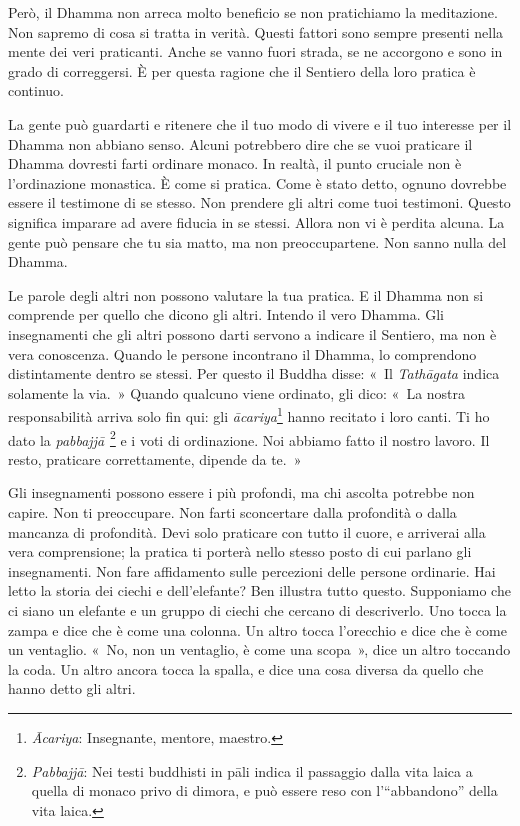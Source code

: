 Però, il Dhamma non arreca molto beneficio se non pratichiamo la
meditazione. Non sapremo di cosa si tratta in verità. Questi fattori
sono sempre presenti nella mente dei veri praticanti. Anche se vanno
fuori strada, se ne accorgono e sono in grado di correggersi. È per
questa ragione che il Sentiero della loro pratica è continuo.

La gente può guardarti e ritenere che il tuo modo di vivere e il tuo
interesse per il Dhamma non abbiano senso. Alcuni potrebbero dire che se
vuoi praticare il Dhamma dovresti farti ordinare monaco. In realtà, il
punto cruciale non è l'ordinazione monastica. È come si pratica. Come è
stato detto, ognuno dovrebbe essere il testimone di se stesso. Non
prendere gli altri come tuoi testimoni. Questo significa imparare ad
avere fiducia in se stessi. Allora non vi è perdita alcuna. La gente può
pensare che tu sia matto, ma non preoccupartene. Non sanno nulla del
Dhamma.

Le parole degli altri non possono valutare la tua pratica. E il Dhamma
non si comprende per quello che dicono gli altri. Intendo il vero
Dhamma. Gli insegnamenti che gli altri possono darti servono a indicare
il Sentiero, ma non è vera conoscenza. Quando le persone incontrano il
Dhamma, lo comprendono distintamente dentro se stessi. Per questo il
Buddha disse: «~Il \emph{Tathāgata} indica solamente la via.~» Quando
qualcuno viene ordinato, gli dico: «~La nostra responsabilità arriva
solo fin qui: gli \emph{ācariya}\footnote{\emph{Ācariya}: Insegnante,
  mentore, maestro.} hanno recitato i loro canti. Ti ho dato la
\emph{pabbajjā}\textsuperscript{~}\footnote{\emph{Pabbajjā}: Nei testi
  buddhisti in pāli indica il passaggio dalla vita laica a quella di
  monaco privo di dimora, e può essere reso con l'``abbandono'' della
  vita laica.} e i voti di ordinazione. Noi abbiamo fatto il nostro
lavoro. Il resto, praticare correttamente, dipende da te.~»

Gli insegnamenti possono essere i più profondi, ma chi ascolta potrebbe
non capire. Non ti preoccupare. Non farti sconcertare dalla profondità o
dalla mancanza di profondità. Devi solo praticare con tutto il cuore, e
arriverai alla vera comprensione; la pratica ti porterà nello stesso
posto di cui parlano gli insegnamenti. Non fare affidamento sulle
percezioni delle persone ordinarie. Hai letto la storia dei ciechi e
dell'elefante? Ben illustra tutto questo. Supponiamo che ci siano un
elefante e un gruppo di ciechi che cercano di descriverlo. Uno tocca la
zampa e dice che è come una colonna. Un altro tocca l'orecchio e dice
che è come un ventaglio. «~No, non un ventaglio, è come una scopa~»,
dice un altro toccando la coda. Un altro ancora tocca la spalla, e dice
una cosa diversa da quello che hanno detto gli altri.

